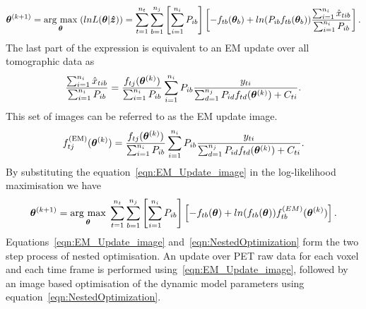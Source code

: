 \begin{equation}
\bm{\theta}^{(k+1)} = \underset{\bm{\theta}}{\operatorname{arg}\,\operatorname{max}}\;(lnL(\bm{\theta}|\bm{\hat{z}})) = 
\sum_{t=1}^{n_t} \sum_{b=1}^{n_j} \left[ \sum_{i=1}^{n_i}  P_{ib} \right]
\left[ -f_{tb}(\bm\theta_b) + 
ln(P_{ib} f_{tb}(\bm\theta_b)) 
\frac{\sum_{i=1}^{n_i} \hat{x}_{tib} }
{ \sum_{i=1}^{n_i}  P_{ib} }
\right] \\ .
\end{equation}
The last part of the expression is equivalent to an EM update over all tomographic data as 
\begin{equation}
\frac{\sum_{i=1}^{n_i} \hat{x}_{tib} }
{\sum_{i=1}^{n_i}  P_{ib}}  =
\frac{f_{tj}(\bm\theta^{(k)})}{\sum_{i=1}^{n_i}  P_{ib}}
\sum_{i=1}^{n_i} P_{ib}
\frac{y_{ti}}
{\sum_{d=1}^{n_j} P_{id} f_{td}(\bm\theta^{(k)}) + C_{ti}}\\.
\end{equation}
This set of images can be referred to as the EM update image.
\begin{equation}
f_{tj}^{(\textrm{EM})}(\bm{\theta}^{(k)}) = 
\frac{f_{tj}(\bm\theta^{(k)})}{\sum_{i=1}^{n_i}  P_{ib}}
\sum_{i=1}^{n_i} P_{ib}
\frac{y_{ti}}
{\sum_{d=1}^{n_j} P_{id} f_{td}(\bm\theta^{(k)}) + C_{ti}}\\.
\label{eqn:EM_Update_image}
\end{equation}
By substituting the equation~\ref{eqn:EM_Update_image} in the log-likelihood maximisation we have
\begin{equation}
\bm{\theta}^{(k+1)} = 
\underset{\bm{\theta}}{\operatorname{arg}\,\operatorname{max}}\;
\sum_{t=1}^{n_t} \sum_{b=1}^{n_j} \left[ \sum_{i=1}^{n_i}  P_{ib} \right]
\left[ -f_{tb}(\bm\theta) + 
ln( f_{tb}(\bm\theta)) 
f_{tb}^{(EM)}(\bm{\theta}^{(k)})
\right] \\ .
\label{eqn:NestedOptimization}
\end{equation}
Equations~\ref{eqn:EM_Update_image} and~\ref{eqn:NestedOptimization} form the two step process of nested optimisation. An update over PET raw data for each voxel and each time frame is performed using~\ref{eqn:EM_Update_image}, followed by an image based optimisation of the dynamic model parameters using equation~\ref{eqn:NestedOptimization}. 
%
